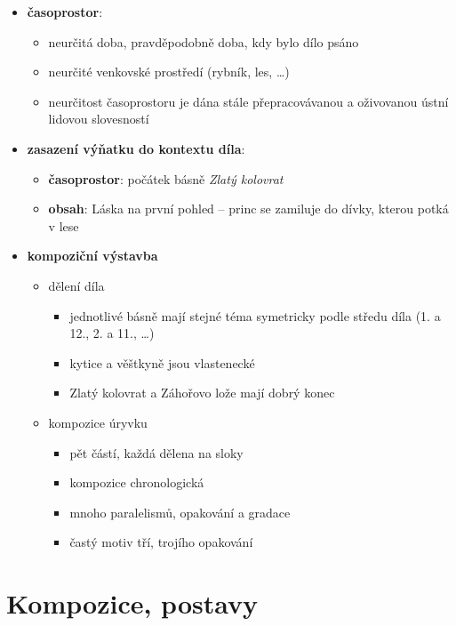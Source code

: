 \documentclass[10pt,a4paper]{article}
\begin{document}
\begin{itemize}
\begin{itemize}
\begin{itemize}
		\end{itemize}
	\end{itemize}
\item \textbf{časoprostor}: 
	\begin{itemize}
	\item neurčitá doba, pravděpodobně doba, kdy bylo dílo psáno
	\item neurčité venkovské prostředí (rybník, les, \ldots)
	\item neurčitost časoprostoru je dána stále přepracovávanou a oživovanou ústní lidovou slovesností
	\end{itemize}
\item \textbf{zasazení výňatku do kontextu díla}:
	\begin{itemize}
	\item \textbf{časoprostor}: počátek básně \textit{Zlatý kolovrat}
	\item \textbf{obsah}: Láska na první pohled -- princ se zamiluje do dívky, kterou potká v lese
	\end{itemize}
\item \textbf{kompoziční výstavba}
	\begin{itemize}
	\item dělení díla
		\begin{itemize}
		\item jednotlivé básně mají stejné téma symetricky podle středu díla (1. a 12., 2. a 11., \ldots)
		\item kytice a věštkyně jsou vlastenecké
		\item Zlatý kolovrat a Záhořovo lože mají dobrý konec
		\end{itemize}
	\item kompozice úryvku
		\begin{itemize}
		\item pět částí, každá dělena na sloky
		\item kompozice chronologická
		\item mnoho paralelismů, opakování a gradace
		\item častý motiv tří, trojího opakování
		\end{itemize}
	\end{itemize}
\end{itemize}
\section*{Kompozice, postavy}
\end{document}
